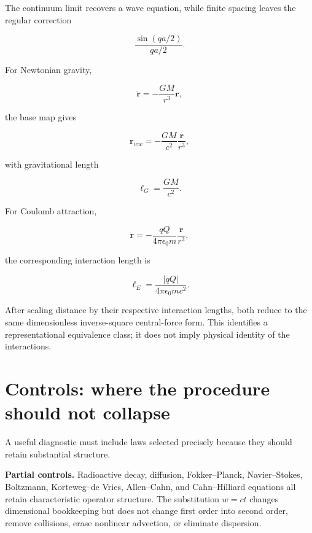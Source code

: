 \documentclass[10pt]{article}
\newcommand{\vect}[1]{\bm{#1}}
\begin{document}
The continuum limit recovers a wave equation, while finite spacing
leaves the regular correction

\begin{equation}
  \frac{\sin(qa/2)}{qa/2}.
\end{equation}

For Newtonian gravity,

\begin{equation}
  \ddot{\vect r}
  =
  -\frac{GM}{r^3}\vect r ,
\end{equation}

the base map gives

\begin{equation}
  \vect r_{ww}
  =
  -\frac{GM}{c^2}\frac{\vect r}{r^3},
\end{equation}

with gravitational length

\begin{equation}
  \ell_G=\frac{GM}{c^2}.
\end{equation}

For Coulomb attraction,

\begin{equation}
  \ddot{\vect r}
  =
  -\frac{qQ}{4\pi\epsilon_0m}
  \frac{\vect r}{r^3},
\end{equation}

the corresponding interaction length is

\begin{equation}
  \ell_E
  =
  \frac{|qQ|}
       {4\pi\epsilon_0mc^2}.
\end{equation}

After scaling distance by their respective interaction lengths, both
reduce to the same dimensionless inverse-square central-force form.
This identifies a representational equivalence class; it does not
imply physical identity of the interactions.

\section{Controls: where the procedure should not collapse}

A useful diagnostic must include laws selected precisely because they
should retain substantial structure.

\textbf{Partial controls.}
Radioactive decay, diffusion, Fokker--Planck, Navier--Stokes,
Boltzmann, Korteweg--de Vries, Allen--Cahn, and Cahn--Hilliard
equations all retain characteristic operator structure. The
substitution \(w=ct\) changes dimensional bookkeeping but does not
change first order into second order, remove collisions, erase
nonlinear advection, or eliminate dispersion.
\end{document}
